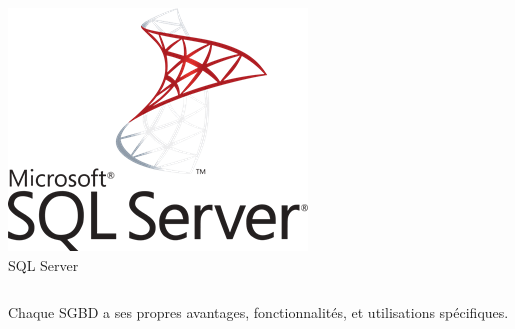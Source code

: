 \begin{frame}
\begin{columns}[T,onlytextwidth]
      \includegraphics[width=0.8\linewidth]{microsoft-sql-server-logo-96AF49E2B3-seeklogo.com.png} \\
      SQL Server
  \end{columns}

  Chaque SGBD a ses propres avantages, fonctionnalités, et utilisations spécifiques.

\end{frame}
